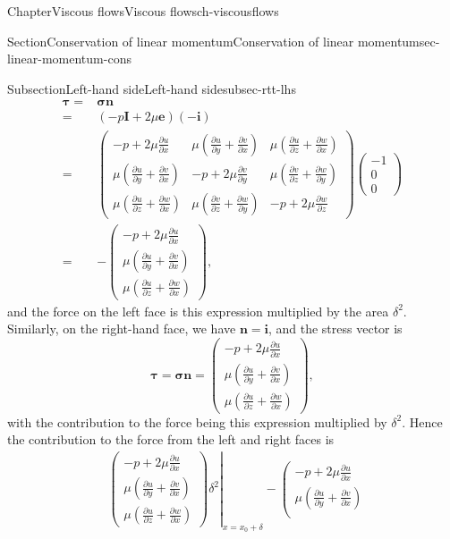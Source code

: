 \documentclass[oneside,10pt,]{book}
\numberwithin{equation}{section}
\newcommand{\pd}[2]{\frac{\partial#1}{\partial#2}}
\newcommand{\be}{\boldsymbol{e}}
\newcommand{\bn}{\boldsymbol{n}}
\newcommand{\bsigma}{\boldsymbol{\sigma}}
\newcommand{\btau}{\boldsymbol{\tau}}
\newcommand{\bI}{\boldsymbol{I}}
\newcommand{\bi}{\boldsymbol{i}}
\begin{document}
\begin{chapterptx}{Chapter}{Viscous flows}{}{Viscous flows}{}{}{ch-viscousflows}
\begin{sectionptx}{Section}{Conservation of linear momentum}{}{Conservation of linear momentum}{}{}{sec-linear-momentum-cons}
\begin{subsectionptx}{Subsection}{Left-hand side}{}{Left-hand side}{}{}{subsec-rtt-lhs}
\begin{align*}
\btau=&\bsigma\bn\\
=&\left(-p\bI+2\mu\be\right)\left(-\bi\right)\\
=&\left(\begin{matrix}
-p+2\mu\pd{u}{x}&\mu\left(\pd{u}{y}+\pd{v}{x}\right)&\mu\left(\pd{u}{z}+\pd{w}{x}\right)\\
\mu\left(\pd{u}{y}+\pd{v}{x}\right)&-p+2\mu\pd{v}{y}&\mu\left(\pd{v}{z}+\pd{w}{y}\right)\\
\mu\left(\pd{u}{z}+\pd{w}{x}\right)&\mu\left(\pd{v}{z}+\pd{w}{y}\right)&-p+2\mu\pd{w}{z}
\end{matrix}\right)
\left(\begin{matrix}-1\\0\\0\end{matrix}\right)\\
=&-\left(\begin{matrix}
-p+2\mu\pd{u}{x}\\
\mu\left(\pd{u}{y}+\pd{v}{x}\right)\\
\mu\left(\pd{u}{z}+\pd{w}{x}\right)
\end{matrix}\right),
\end{align*}
and the force on the left face is this expression multiplied by the area \(\delta^2\). Similarly, on the right-hand face, we have \(\bn=\bi\), and the stress vector is%
\begin{equation*}
\btau=\bsigma\bn
=\left(\begin{matrix}
-p+2\mu\pd{u}{x}\\
\mu\left(\pd{u}{y}+\pd{v}{x}\right)\\
\mu\left(\pd{u}{z}+\pd{w}{x}\right)
\end{matrix}\right),
\end{equation*}
with the contribution to the force being this expression multiplied by \(\delta^2\). Hence the contribution to the force from the left and right faces is%
\begin{align*}
&\left.\left(\begin{matrix}
-p+2\mu\pd{u}{x}\\
\mu\left(\pd{u}{y}+\pd{v}{x}\right)\\
\mu\left(\pd{u}{z}+\pd{w}{x}\right)
\end{matrix}\right)\delta^2\right|_{x=x_0+\delta}
-\left.\left(\begin{matrix}
-p+2\mu\pd{u}{x}\\
\mu\left(\pd{u}{y}+\pd{v}{x}\right)\\

\end{matrix}
\end{align*}
\end{subsectionptx}
\end{sectionptx}
\end{chapterptx}
\end{document}
